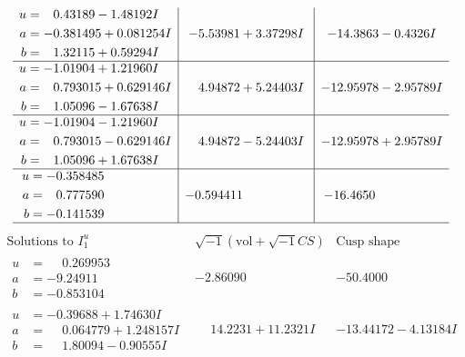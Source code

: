 \documentclass[1p]{elsarticle_modified}
\theoremstyle{definition}
\newcommand{\I}{\sqrt{-1}}
\begin{document}
$$\begin{array}{c|c|c}
\begin{aligned}
u &= \phantom{-}0.43189 - 1.48192 I \\
a &= -0.381495 + 0.081254 I \\
b &= \phantom{-}1.32115 + 0.59294 I\end{aligned}
 & -5.53981 + 3.37298 I & -14.3863 - 0.4326 I \\ \hline\begin{aligned}
u &= -1.01904 + 1.21960 I \\
a &= \phantom{-}0.793015 + 0.629146 I \\
b &= \phantom{-}1.05096 - 1.67638 I\end{aligned}
 & \phantom{-}4.94872 + 5.24403 I & -12.95978 - 2.95789 I \\ \hline\begin{aligned}
u &= -1.01904 - 1.21960 I \\
a &= \phantom{-}0.793015 - 0.629146 I \\
b &= \phantom{-}1.05096 + 1.67638 I\end{aligned}
 & \phantom{-}4.94872 - 5.24403 I & -12.95978 + 2.95789 I \\ \hline\begin{aligned}
u &= -0.358485\phantom{ +0.000000I} \\
a &= \phantom{-}0.777590\phantom{ +0.000000I} \\
b &= -0.141539\phantom{ +0.000000I}\end{aligned}
 & -0.594411\phantom{ +0.000000I} & -16.4650\phantom{ +0.000000I}\\
 \hline 
 \end{array}$$\newpage$$\begin{array}{c|c|c}  
\text{Solutions to }I^u_{1}& \I (\text{vol} + \sqrt{-1}CS) & \text{Cusp shape}\\
 \hline 
\begin{aligned}
u &= \phantom{-}0.269953\phantom{ +0.000000I} \\
a &= -9.24911\phantom{ +0.000000I} \\
b &= -0.853104\phantom{ +0.000000I}\end{aligned}
 & -2.86090\phantom{ +0.000000I} & -50.4000\phantom{ +0.000000I} \\ \hline\begin{aligned}
u &= -0.39688 + 1.74630 I \\
a &= \phantom{-}0.064779 + 1.248157 I \\
b &= \phantom{-}1.80094 - 0.90555 I\end{aligned}
 & \phantom{-}14.2231 + 11.2321 I & -13.44172 - 4.13184 I \\ \hline\begin{aligned}

\end{aligned}
\end{array}$$
\end{document}
